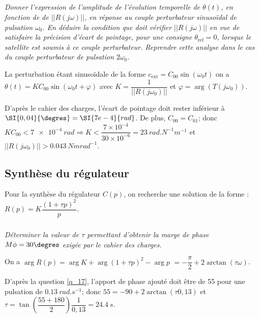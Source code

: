 \subparagraph{\label{q_20}}\textit{Donner l’expression de l’amplitude de  l'évolution temporelle de $\theta(t)$, en fonction de 
de $|| R\left(j \omega\right)||$,  en réponse
au couple perturbateur sinusoïdal de pulsation $\omega_0$. En déduire la condition que doit vérifier $|| R\left(j \omega\right)||$ en vue de
satisfaire la précision d’écart de pointage, pour une consigne $\theta_{\text{ref}} = 0$, lorsque le satellite est soumis à ce couple
perturbateur. Reprendre cette analyse dans le cas du couple 
perturbateur de pulsation $2\omega_0$.}
\ifprof
\begin{corrige}
La perturbation étant sinusoïdale de la forme 
$c_{\text{ext}} = C_{00}\sin(\omega_0 t)$ on a 
$\theta(t)=K C_{00}\sin(\omega_0 t + \varphi)$ avec 
$K = \dfrac{1}{|| R\left(j\omega_0\right)||} $ et 
$\varphi = \arg\left( T(j\omega_0) \right)$.

D'après le cahier des charges, l'écart de pointage doit rester inférieur à $\SI{0,04}{\degres} = \SI{7e-4}{rad}$.
De plus, $C_{00}=C_{01}$; donc $K C_{00} <  \SI{7e-4}{rad} \Rightarrow K < \dfrac{7\times 10^{-4}}{30\times 10^{-6}} = \SI{23}{rad.N^{-1}m^{-1}}$ et $|| R\left(j\omega_0\right)|| > \SI{0,043}{Nmrad^{-1}}$.

\end{corrige}

\else
\fi

\subsection{\label{sec:3:C} Synthèse du régulateur}

Pour la synthèse du régulateur $C(p)$, on recherche une solution de la forme : $R(p)=K \dfrac{\left(1+\tau p\right)^2}{p}$.

\subparagraph{\label{q_21}}\textit{Déterminer la valeur de
$\tau$  permettant d’obtenir 
la marge de phase 
$M \phi = 30\degres$
 exigée par le cahier des charges.}
\ifprof
\begin{corrige}
On a $\arg{R(p)} = \arg{K}+ \arg{\left(1+\tau p\right)^2} - \arg{p}$
$ =-\dfrac{\pi}{2}  +2 \arctan\left(\tau \omega \right)$.

D'après la question \ref{q_17}, l'apport de phase ajouté doit être de \SI{55}{\degres} pour une pulsation de $ \SI{0,13}{rad.s^{-1}}$; donc $55=-90  +2 \arctan\left(\tau 0,13 \right) $ et $\tau = \tan \left(\dfrac{55+180}{2}\right) \dfrac{1}{0,13} = \SI{24,4}{s}$.
\end{corrige}
\else
\fi 



